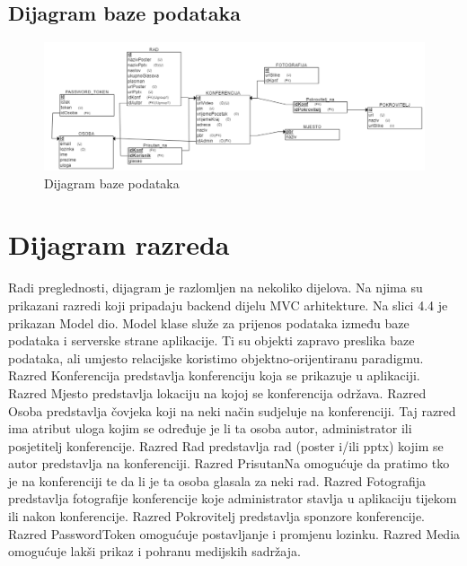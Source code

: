 			\subsection{Dijagram baze podataka}
					\begin{figure}[H]
						\includegraphics[scale=0.55]{dijagrami/dijagram baze podataka.PNG} %
						\centering
						\caption{Dijagram baze podataka}
						\label{fig:promjene3}
					\end{figure}			
			\eject
			
			
		\section{Dijagram razreda}
		
		
			Radi preglednosti, dijagram je razlomljen na nekoliko dijelova. Na njima su prikazani razredi koji pripadaju backend dijelu MVC arhitekture.
			Na slici 4.4 je prikazan Model dio. Model klase služe za prijenos podataka između baze podataka i serverske strane aplikacije. Ti su objekti zapravo preslika baze podataka, ali umjesto relacijske koristimo objektno-orijentiranu paradigmu. 
			Razred Konferencija predstavlja konferenciju koja se prikazuje u aplikaciji. 
Razred Mjesto predstavlja lokaciju na kojoj se konferencija održava.
Razred Osoba predstavlja čovjeka koji na neki način sudjeluje na konferenciji.  Taj razred ima atribut uloga kojim se određuje je li ta osoba autor, administrator ili posjetitelj konferencije. 
Razred Rad predstavlja rad (poster i/ili pptx) kojim se autor predstavlja na konferenciji.
Razred PrisutanNa omogućuje da pratimo tko je na konferenciji te da li je ta osoba glasala za neki rad.
Razred Fotografija predstavlja fotografije konferencije koje administrator stavlja u aplikaciju tijekom ili nakon konferencije.
Razred Pokrovitelj predstavlja sponzore konferencije. 
Razred PasswordToken omogućuje postavljanje i promjenu lozinku.
Razred Media omogućuje lakši prikaz i pohranu medijskih sadržaja.

